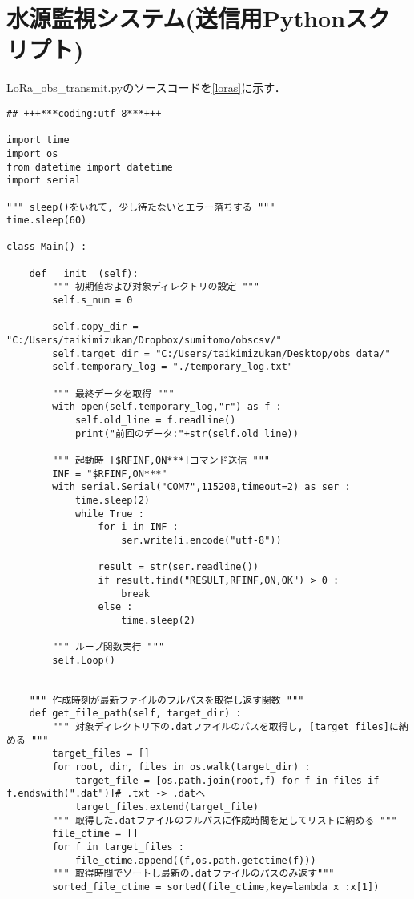 \section{水源監視システム(送信用Pythonスクリプト)}
\centering
LoRa\_obs\_transmit.pyのソースコードを\ref{loras}に示す．
\begin{lstlisting}[label=loras,caption=LoRa\_obs\_transmit.py]
## +++***coding:utf-8***+++

import time
import os
from datetime import datetime
import serial

""" sleep()をいれて, 少し待たないとエラー落ちする """
time.sleep(60)

class Main() :
    
    def __init__(self):
        """ 初期値および対象ディレクトリの設定 """
        self.s_num = 0

        self.copy_dir = "C:/Users/taikimizukan/Dropbox/sumitomo/obscsv/" 
        self.target_dir = "C:/Users/taikimizukan/Desktop/obs_data/"              
        self.temporary_log = "./temporary_log.txt"

        """ 最終データを取得 """
        with open(self.temporary_log,"r") as f :
            self.old_line = f.readline()
            print("前回のデータ:"+str(self.old_line))
               
        """ 起動時 [$RFINF,ON***]コマンド送信 """
        INF = "$RFINF,ON***"
        with serial.Serial("COM7",115200,timeout=2) as ser :
            time.sleep(2)
            while True :
                for i in INF :
                    ser.write(i.encode("utf-8"))

                result = str(ser.readline())
                if result.find("RESULT,RFINF,ON,OK") > 0 :
                    break
                else :
                    time.sleep(2)

        """ ループ関数実行 """
        self.Loop()
        

    """ 作成時刻が最新ファイルのフルパスを取得し返す関数 """
    def get_file_path(self, target_dir) : 
        """ 対象ディレクトリ下の.datファイルのパスを取得し, [target_files]に納める """
        target_files = []
        for root, dir, files in os.walk(target_dir) :
            target_file = [os.path.join(root,f) for f in files if f.endswith(".dat")]# .txt -> .datへ
            target_files.extend(target_file)
        """ 取得した.datファイルのフルパスに作成時間を足してリストに納める """
        file_ctime = []
        for f in target_files :
            file_ctime.append((f,os.path.getctime(f)))        
        """ 取得時間でソートし最新の.datファイルのパスのみ返す"""
        sorted_file_ctime = sorted(file_ctime,key=lambda x :x[1])
                           

\end{lstlisting}
